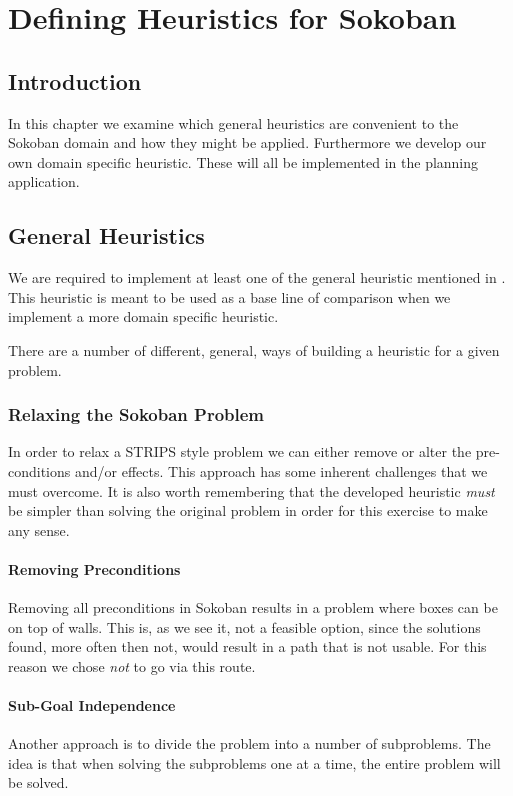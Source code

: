 \chapter{Defining Heuristics for Sokoban}
\label{cha:heuristics}

\section{Introduction}
In this chapter we examine which general heuristics are convenient to
the Sokoban domain and how they might be applied. Furthermore we
develop our own domain specific heuristic. These will all be
implemented in the planning application.

\section{General Heuristics}
We are required to implement at least one of the general heuristic
mentioned in \citet{Russell2003GeneralHeuristics}. This heuristic is
meant to be used as a base line of comparison when we implement a more
domain specific heuristic.

There are a number of different, general, ways of building a heuristic
for a given problem.

\subsection{Relaxing the Sokoban Problem}
In order to relax a STRIPS style problem we can either remove or alter
the pre-conditions and/or effects. This approach has some inherent
challenges that we must overcome. It is also worth remembering that
the developed heuristic \emph{must} be simpler than solving the
original problem in order for this exercise to make any sense.

\subsubsection{Removing Preconditions}

Removing all preconditions in Sokoban results in a problem where boxes
can be on top of walls. This is, as we see it, not a feasible option,
since the solutions found, more often then not, would result in a path
that is not usable. For this reason we chose \emph{not} to go via this
route.

\subsubsection{Sub-Goal Independence}
Another approach is to divide the problem into a number of
subproblems. The idea is that when solving the subproblems one at a
time, the entire problem will be solved.

